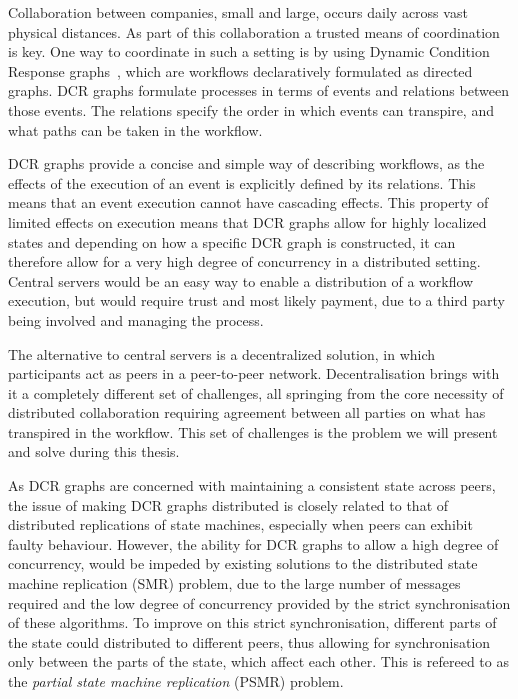 \documentclass{article}
\begin{document}
	Collaboration between companies, small and large, occurs daily across vast physical distances.
	As part of this collaboration a trusted means of coordination is key.
	One way to coordinate in such a setting is by using Dynamic Condition Response graphs~\cite{hildebrandt_declarative_2011}, which are workflows declaratively formulated as directed graphs.
	DCR graphs formulate processes in terms of events and relations between those events.
	The relations specify the order in which events can transpire, and what paths can be taken in the workflow.

	DCR graphs provide a concise and simple way of describing workflows, as the effects of the execution of an event is explicitly defined by its relations.
	This means that an event execution cannot have cascading effects.
	This property of limited effects on execution means that DCR graphs allow for highly localized states and depending on how a specific DCR graph is constructed, it can therefore allow for a very high degree of concurrency in a distributed setting.
	Central servers would be an easy way to enable a distribution of a workflow execution, but would require trust and most likely payment, due to a third party being involved and managing the process.

	The alternative to central servers is a decentralized solution, in which participants act as peers in a peer-to-peer network.
	Decentralisation brings with it a completely different set of challenges, all springing from the core necessity of distributed collaboration requiring agreement between all parties on what has transpired in the workflow.
	This set of challenges is the problem we will present and solve during this thesis.

	As DCR graphs are concerned with maintaining a consistent state across peers, the issue of making DCR graphs distributed is closely related to that of distributed replications of state machines, especially when peers can exhibit faulty behaviour.
	However, the ability for DCR graphs to allow a high degree of concurrency, would be impeded by existing solutions to the distributed state machine replication (SMR) problem, due to the large number of messages required and the low degree of concurrency provided by the strict synchronisation of these algorithms.
	To improve on this strict synchronisation, different parts of the state could distributed to different peers, thus allowing for synchronisation only between the parts of the state, which affect each other.
	This is refereed to as the \textit{partial state machine replication} (PSMR) problem.
\end{document}
